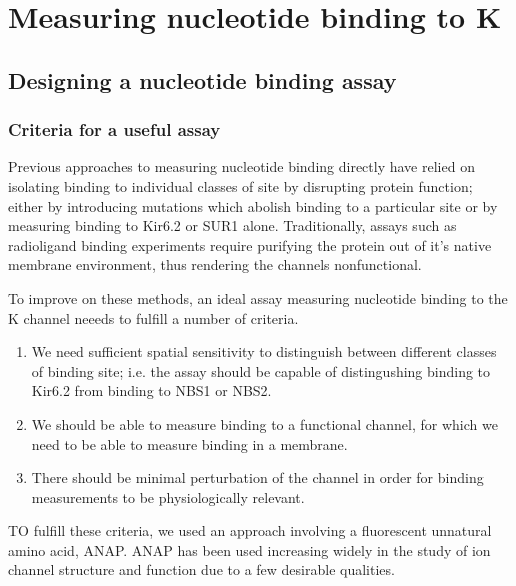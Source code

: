\chapter{\label{ch:3}Measuring nucleotide binding to K\ATP} 

\graphicspath{{figures/ch3/}}

\minitoc

\section{Designing a nucleotide binding assay}

\subsection{Criteria for a useful assay}

Previous approaches to measuring nucleotide binding directly have relied on isolating binding to individual classes of site by disrupting protein function; either by introducing mutations which abolish binding to a particular site or by measuring binding to Kir6.2 or SUR1 alone.
Traditionally, assays such as radioligand binding experiments require purifying the protein out of it's native membrane environment, thus rendering the channels nonfunctional.

To improve on these methods, an ideal assay measuring nucleotide binding to the K\ATP{} channel neeeds to fulfill a number of criteria.

\begin{enumerate}
	\item We need sufficient spatial sensitivity to distinguish between different classes of binding site; i.e. the assay should be capable of distingushing binding to Kir6.2 from binding to NBS1 or NBS2.
	\item We should be able to measure binding to a functional channel, for which we need to be able to measure binding in a membrane.
	\item There should be minimal perturbation of the channel in order for binding measurements to be physiologically relevant.
\end{enumerate}

TO fulfill these criteria, we used an approach involving a fluorescent unnatural amino acid, ANAP.
ANAP has been used increasing widely in the study of ion channel structure and function due to a few desirable qualities.


